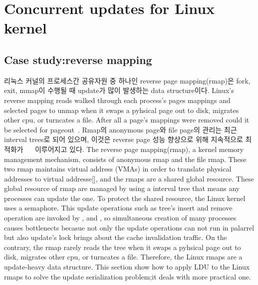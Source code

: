 \section{Concurrent updates for Linux kernel}

\subsection{Case study:reverse mapping}


\ifkor
리눅스 커널의 프로세스간 공유자원 중 하나인 reverse page mapping(rmap)은 fork, exit, mmap이 수행될 때
update가 많이 발생하는 data structure이다.
Linux's reverse mapping reads walked through each process’s pages mappings and
selected pages to unmap when it swaps a pyhsical page out to disk, migrates
other cpu, or turncates a file.
After all a page’s mappings were removed could it be selected for
pageout~\cite{OBJMAPOLS}.
Rmap의 anonymous page와 file page의 관리는 최근 interval trees로 되어 있으며, 이것은 reverse page
성능 향상으로 위해 지속적으로 최적화가 ~\cite{CorbetLWNRMAP}~\cite{CorbetLWNANON} 이루어지고 있다. 
\else
The reverse page mapping(rmap), a kernel memory management mechanism, consists
of anonymous rmap and the file rmap.
These two rmap maintains virtual address (VMAs) in order to translate physical
addresses to virtual addresse[], and the rmaps are a shared global resource.
These global resource of rmap are managed by using a interval tree that means
any processes can update the one.
To protect the shared resource, the Linux kernel uses a semaphore.
This update operations such as tree's insert and remove operation are invoked by
,  and , so simultaneous creation of many
processes causes bottlenects becasue not only the update operations can not run
in palarrel but also update's lock brings about the cache invalidation traffic.
On the contrary, the rmap rarely reads the tree when it swaps a pyhsical page
out to disk, migrates other cpu, or turncates a file.
Therefore, the Linux rmaps are a update-heavy data structure. 
This section show how to apply LDU to the Linux rmaps to solve the update
serialization problem;it deals with more practical one.
\fi

